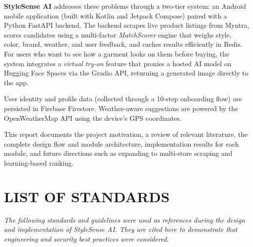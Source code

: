 \documentclass[12pt,a4paper]{report}
\newcommand{\ProjectShort}{StyleSense AI}
\begin{document}
\textbf{\ProjectShort{}} addresses these problems through a two-tier system: an Android mobile application (built with Kotlin and Jetpack Compose) paired with a Python FastAPI backend. The backend scrapes live product listings from Myntra, scores candidates using a multi-factor \textit{MatchScorer} engine that weighs style, color, brand, weather, and user feedback, and caches results efficiently in Redis. For users who want to see how a garment looks on them before buying, the system integrates a \textit{virtual try-on} feature that proxies a hosted AI model on Hugging Face Spaces via the Gradio API, returning a generated image directly to the app.

User identity and profile data (collected through a 10-step onboarding flow) are persisted in Firebase Firestore. Weather-aware suggestions are powered by the OpenWeatherMap API using the device's GPS coordinates.

This report documents the project motivation, a review of relevant literature, the complete design flow and module architecture, implementation results for each module, and future directions such as expanding to multi-store scraping and learning-based ranking.

\chapter*{LIST OF STANDARDS}

\textit{The following standards and guidelines were used as references during the design and implementation of \ProjectShort{}. They are cited here to demonstrate that engineering and security best practices were considered.}
\end{document}
